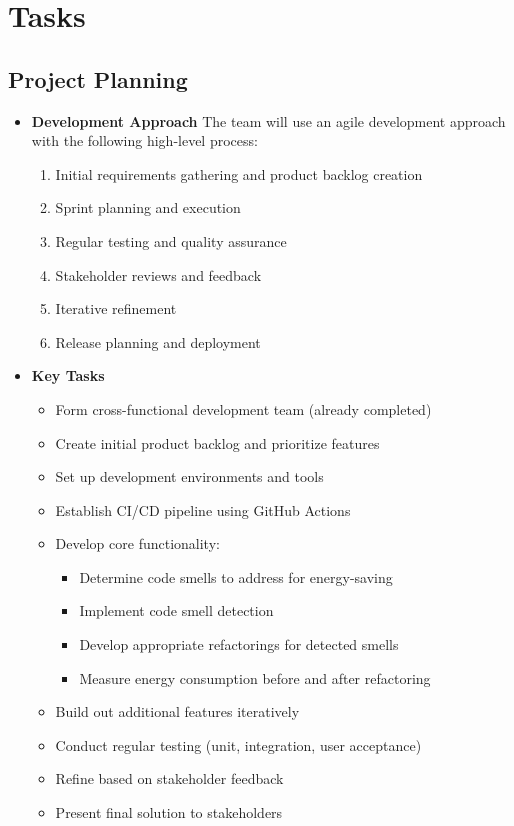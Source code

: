 \documentclass[12pt]{article}
\begin{document}
\section{Tasks}
\subsection{Project Planning}
\begin{itemize}

  \item \textbf{Development Approach}
    The team will use an agile development approach with the
    following high-level process:
    \begin{enumerate}
      \item Initial requirements gathering and product backlog creation
      \item Sprint planning and execution
      \item Regular testing and quality assurance
      \item Stakeholder reviews and feedback
      \item Iterative refinement
      \item Release planning and deployment
    \end{enumerate}

  \item \textbf{Key Tasks}
    \begin{itemize}
      \item Form cross-functional development team (already completed)
      \item Create initial product backlog and prioritize features
      \item Set up development environments and tools
      \item Establish CI/CD pipeline using GitHub Actions
      \item Develop core functionality:
        \begin{itemize}
          \item Determine code smells to address for energy-saving
          \item Implement code smell detection
          \item Develop appropriate refactorings for detected smells
          \item Measure energy consumption before and after refactoring
        \end{itemize}
      \item Build out additional features iteratively
      \item Conduct regular testing (unit, integration, user acceptance)
      \item Refine based on stakeholder feedback
      \item Present final solution to stakeholders


\end{itemize}
\end{itemize}
\end{document}

